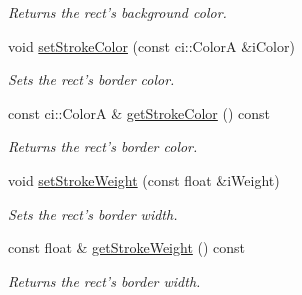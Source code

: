 \begin{DoxyCompactItemize}
\begin{DoxyCompactList}\small\item\em Returns the rect's background color. \end{DoxyCompactList}\item 
\hypertarget{class_gui_rect_a69059c87dd29c4867ac364a016c305ad}{void \hyperlink{class_gui_rect_a69059c87dd29c4867ac364a016c305ad}{set\-Stroke\-Color} (const ci\-::\-Color\-A \&i\-Color)}\label{class_gui_rect_a69059c87dd29c4867ac364a016c305ad}

\begin{DoxyCompactList}\small\item\em Sets the rect's border color. \end{DoxyCompactList}\item 
\hypertarget{class_gui_rect_abd68d08cff4e0a71e8122ce161e7ffb9}{const ci\-::\-Color\-A \& \hyperlink{class_gui_rect_abd68d08cff4e0a71e8122ce161e7ffb9}{get\-Stroke\-Color} () const }\label{class_gui_rect_abd68d08cff4e0a71e8122ce161e7ffb9}

\begin{DoxyCompactList}\small\item\em Returns the rect's border color. \end{DoxyCompactList}\item 
\hypertarget{class_gui_rect_a4aca606919a0081466c6fb77a018dda2}{void \hyperlink{class_gui_rect_a4aca606919a0081466c6fb77a018dda2}{set\-Stroke\-Weight} (const float \&i\-Weight)}\label{class_gui_rect_a4aca606919a0081466c6fb77a018dda2}

\begin{DoxyCompactList}\small\item\em Sets the rect's border width. \end{DoxyCompactList}\item 
\hypertarget{class_gui_rect_aba27ea56a68ecac460b4112c65055370}{const float \& \hyperlink{class_gui_rect_aba27ea56a68ecac460b4112c65055370}{get\-Stroke\-Weight} () const }\label{class_gui_rect_aba27ea56a68ecac460b4112c65055370}

\begin{DoxyCompactList}\small\item\em Returns the rect's border width. \end{DoxyCompactList}\end{DoxyCompactItemize}

